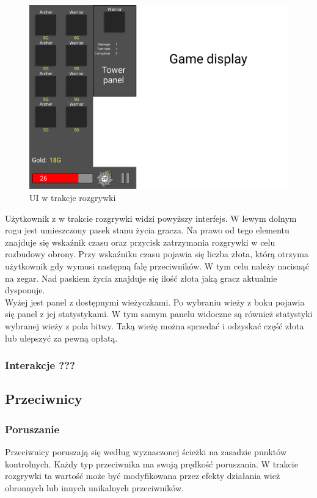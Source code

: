 \documentclass[a4paper,12pt, twoside, titlepage]{article}
\begin{document}
\begin{figure}[!htb]
	\begin{center}
		\includegraphics[width=12cm]{import/UI_Game.pdf}
	\end{center}
	\caption{UI w trakcje rozgrywki}
\end{figure}

Użytkownik z w trakcie rozgrywki widzi powyższy interfejs. W lewym dolnym rogu jest umieszczony pasek stanu życia gracza. Na prawo od tego elementu znajduje się wskaźnik czasu oraz przycisk zatrzymania rozgrywki w celu rozbudowy obrony. Przy wskaźniku czasu pojawia się liczba złota, którą otrzyma użytkownik gdy wymusi następną falę przeciwników. W tym celu należy nacisnąć na zegar. Nad paskiem życia znajduje się ilość złota jaką gracz aktualnie dysponuje.\\
Wyżej jest panel z dostępnymi wieżyczkami. Po wybraniu wieży z boku pojawia się panel z jej statystykami. W tym samym panelu widoczne są również statystyki wybranej wieży z pola bitwy. Taką wieżę można sprzedać i odzyskać część złota lub ulepszyć za pewną opłatą.

\subsubsection{Interakcje ???}
\subsection{Przeciwnicy}
\subsubsection{Poruszanie}
Przeciwnicy poruszają się według wyznaczonej ścieżki na zasadzie punktów kontrolnych. Każdy typ przeciwnika ma swoją prędkość poruszania. W trakcie rozgrywki ta wartość może być modyfikowana przez efekty działania wież obronnych lub innych unikalnych przeciwników.
\end{document}
